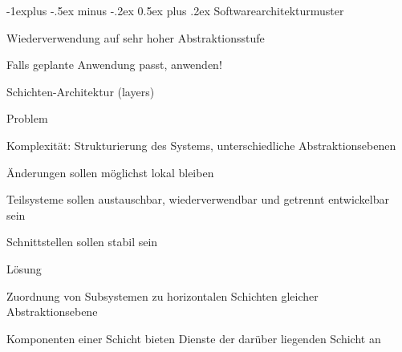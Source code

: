 \documentclass[a4paper]{article}
\makeatletter
\renewcommand{\subsection}{\@startsection{subsection}{2}{0mm}%
                                {-1explus -.5ex minus -.2ex}%
                                {0.5ex plus .2ex}%
                                {\normalfont\normalsize\bfseries}}
\makeatother
\begin{document}
\begin{multicols}{3}
  \subsection{Softwarearchitekturmuster}
  \begin{itemize*}
    \item Wiederverwendung auf sehr hoher Abstraktionsstufe
    \item Falls geplante Anwendung passt, anwenden!
  \end{itemize*}

  Schichten-Architektur (layers)
  \begin{itemize*}
    \item Problem
          \begin{itemize*}
            \item Komplexität: Strukturierung des Systems, unterschiedliche Abstraktionsebenen
            \item Änderungen sollen möglichst lokal bleiben
            \item Teilsysteme sollen austauschbar, wiederverwendbar und getrennt entwickelbar sein
            \item Schnittstellen sollen stabil sein
          \end{itemize*}
    \item Lösung
          \begin{itemize*}
            \item Zuordnung von Subsystemen zu horizontalen Schichten gleicher Abstraktionsebene
            \item Komponenten einer Schicht bieten Dienste der darüber liegenden Schicht an
          \end{itemize*}
  \end{itemize*}


\end{multicols}
\end{document}
